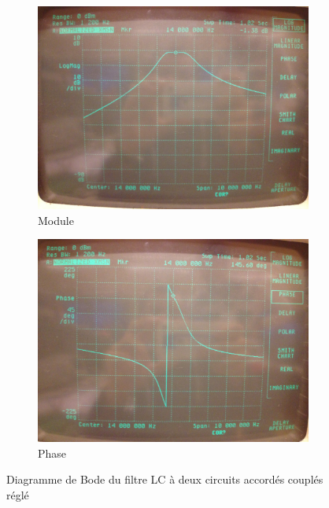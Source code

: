 \documentclass{article}
\begin{document}
\begin{figure}[h]
	\centering
	\begin{subfigure}[b]{0.43\textwidth}
		\centering
		\includegraphics[width=\textwidth]{bande_2MHz_bienregle}
		\caption{Module}
	\end{subfigure}
	\hfill
	\begin{subfigure}[b]{0.43\textwidth}
		\centering
		\includegraphics[width=\textwidth]{phase_bienregle}
		\caption{Phase}
	\end{subfigure}
	\caption{Diagramme de Bode du filtre LC à deux circuits accordés couplés réglé}
	\label{fig:LCregle}
\end{figure}


\end{document}
